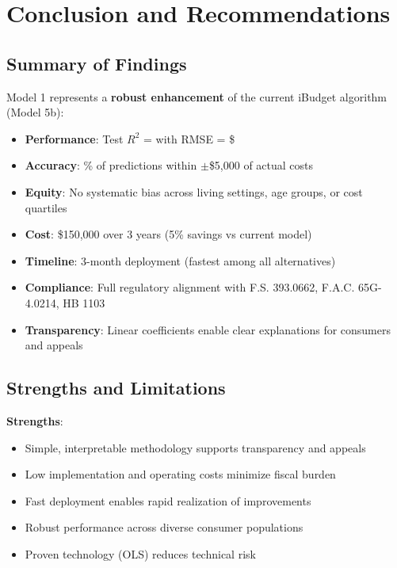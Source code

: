 \section{Conclusion and Recommendations}

\subsection{Summary of Findings}

Model 1 represents a \textbf{robust enhancement} of the current iBudget algorithm (Model 5b):

\begin{itemize}
    \item \textbf{Performance}: Test $R^2$ = \ModelOneRSquaredTest{} with RMSE = \$\ModelOneRMSETest{}
    \item \textbf{Accuracy}: \ModelOneWithinFiveK{}\% of predictions within $\pm$\$5,000 of actual costs
    \item \textbf{Equity}: No systematic bias across living settings, age groups, or cost quartiles
    \item \textbf{Cost}: \$150,000 over 3 years (5\% savings vs current model)
    \item \textbf{Timeline}: 3-month deployment (fastest among all alternatives)
    \item \textbf{Compliance}: Full regulatory alignment with F.S. 393.0662, F.A.C. 65G-4.0214, HB 1103
    \item \textbf{Transparency}: Linear coefficients enable clear explanations for consumers and appeals
\end{itemize}

\subsection{Strengths and Limitations}

\textbf{Strengths}:
\begin{itemize}
    \item Simple, interpretable methodology supports transparency and appeals
    \item Low implementation and operating costs minimize fiscal burden
    \item Fast deployment enables rapid realization of improvements
    \item Robust performance across diverse consumer populations
    \item Proven technology (OLS) reduces technical risk
\end{itemize}


